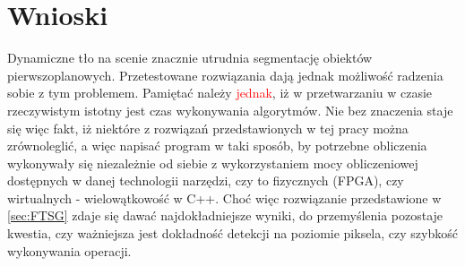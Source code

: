 \chapter{Wnioski}
\label{sec:wnioski}
Dynamiczne tło na scenie znacznie utrudnia segmentację obiektów pierwszoplanowych. Przetestowane rozwiązania dają jednak możliwość radzenia sobie z tym problemem. Pamiętać należy \textcolor{red}{jednak}, iż w przetwarzaniu w czasie rzeczywistym istotny jest czas wykonywania algorytmów. Nie bez znaczenia staje się więc fakt, iż niektóre z rozwiązań przedstawionych w tej pracy można zrównoleglić, a więc napisać program w taki sposób, by potrzebne obliczenia wykonywały się niezależnie od siebie z wykorzystaniem mocy obliczeniowej dostępnych w danej technologii narzędzi, czy to fizycznych (FPGA), czy wirtualnych - wielowątkowość w C++. Choć więc rozwiązanie przedstawione w \ref{sec:FTSG} zdaje się dawać najdokładniejsze wyniki, do przemyślenia pozostaje kwestia, czy ważniejsza jest dokładność detekcji na poziomie piksela, czy szybkość wykonywania operacji.